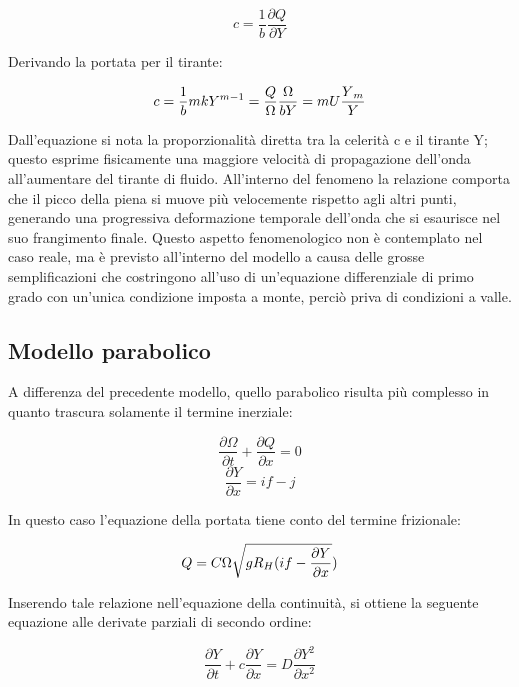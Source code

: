 \documentclass[12pt]{article} %
\begin{document}
\begin{equation}
c=\frac{1}{b}\frac{\partial Q}{\partial Y}
\end{equation}

\noindent Derivando la portata per il tirante:

\begin{equation} 
c=\frac{1}{b}mkY^{m-1}=\frac{Q}{\Omega}\frac{\Omega}{bY}=mU\frac{Y\textsubscript{$m$}}{Y}
\end{equation}

\noindent Dall’equazione si nota la proporzionalità diretta tra la celerità c e il tirante Y; questo esprime fisicamente una maggiore velocità di propagazione dell’onda all’aumentare del tirante di fluido.
All’interno del fenomeno la relazione comporta che il picco della piena si muove più velocemente rispetto agli altri punti, generando una progressiva deformazione temporale dell’onda che si esaurisce nel suo frangimento finale.
Questo aspetto fenomenologico non è contemplato nel caso reale, ma è previsto all’interno del modello a causa delle grosse semplificazioni che costringono all’uso di un’equazione differenziale di primo grado con un’unica condizione imposta a monte, perciò priva di condizioni a valle.

\subsection{Modello parabolico}
\noindent A differenza del precedente modello, quello parabolico risulta più complesso in quanto trascura solamente il termine inerziale:

\begin{equation}
\frac{\partial \Omega }{\partial t}+\frac{\partial Q}{\partial x}=0
\end{equation}
\begin{equation}
\frac{\partial Y }{\partial x}=if-j
\end{equation}

\noindent In questo caso l’equazione della portata tiene conto del termine frizionale:

\begin{equation}
    Q=C\Omega\sqrt{gR\textsubscript{$H$}(if-\frac{\partial Y}{\partial x}})
\end{equation}

\noindent Inserendo tale relazione nell’equazione della continuità, si ottiene la seguente equazione alle derivate parziali di secondo ordine:

\begin{equation}
\frac{\partial Y}{\partial t}+c\frac{\partial Y}{\partial x}=D\frac{\partial Y^2}{\partial x^2}
\end{equation}
\end{document}
